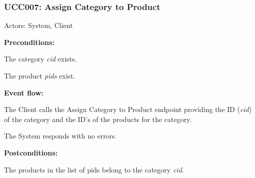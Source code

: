 \begin{ucbox}{\subsubsection{UCC007: Assign Category to Product}}
\label{UCC007}

Actors: System, Client

\textbf{Preconditions:}

\ucitem The category \textit{cid} exists.

\ucitem The product \textit{pids} exist.

\textbf{Event flow:}

\ucitem The Client calls the Assign Category to Product endpoint providing the ID (\textit{cid}) of the category and the ID’s of the products for the category.

\ucitem The System responds with no errors.

\textbf{Postconditions:}

\ucitem The products in the list of pids belong to the category \textit{cid}.

\end{ucbox}
\newpage